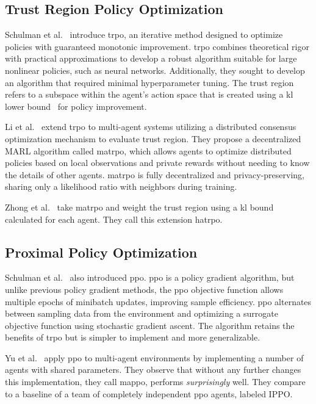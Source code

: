     \subsection*{Trust Region Policy Optimization}

Schulman et al.~\cite{schulman2017} introduce \gls{trpo}, an iterative 
method designed to optimize policies with guaranteed monotonic improvement. 
\Gls{trpo} combines theoretical rigor with practical approximations to 
develop a robust algorithm suitable for large nonlinear policies, 
such as neural networks. Additionally, they sought to develop 
an algorithm that required minimal hyperparameter tuning.
%
The trust region refers to a subspace within the agent's action
space that is created using a \gls{kl} lower bound~%
\cite{kakade2002} for policy improvement.

Li et al.~\cite{li2023c} extend \gls{trpo} to multi-agent systems
utilizing a distributed consensus optimization mechanism to 
evaluate trust region. They propose a decentralized MARL algorithm called 
\gls{matrpo}, which allows agents to optimize 
distributed policies based on local observations and private rewards 
without needing to know the details of other agents. 
\gls{matrpo} is fully decentralized and privacy-preserving, 
sharing only a likelihood ratio with neighbors during training. 

Zhong et al.~\cite{zhong2024} take \gls{matrpo} and weight the 
trust region using a \gls{kl} bound calculated for each agent.
They call this extension \gls{hatrpo}.

    \subsection*{Proximal Policy Optimization}

Schulman et al.~\cite{schulman2017a} also introduced \gls{ppo}.
\Gls{ppo} is a policy gradient algorithm, but unlike previous 
policy gradient methods, the \gls{ppo} objective function allows 
multiple epochs of minibatch updates, improving sample efficiency. 
\Gls{ppo} alternates between sampling data from the environment and 
optimizing a surrogate objective function using stochastic gradient ascent. 
The algorithm retains the benefits of \gls{trpo} but is simpler to 
implement and more generalizable.

Yu et al.~\cite*{yu2022} apply \gls{ppo} to multi-agent environments
by implementing a number of agents with shared parameters.
They observe that without any further changes this implementation,
they call \gls{mappo}, performs \emph{surprisingly} well.
They compare to a baseline of a team of completely independent 
\gls{ppo} agents, labeled IPPO.

